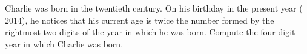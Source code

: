 Charlie was born in the twentieth century. On his birthday in the present year ($2014$), he notices that his current age is twice the number formed by the rightmost two digits of the year in which he was born. Compute the four-digit year in which Charlie was born.